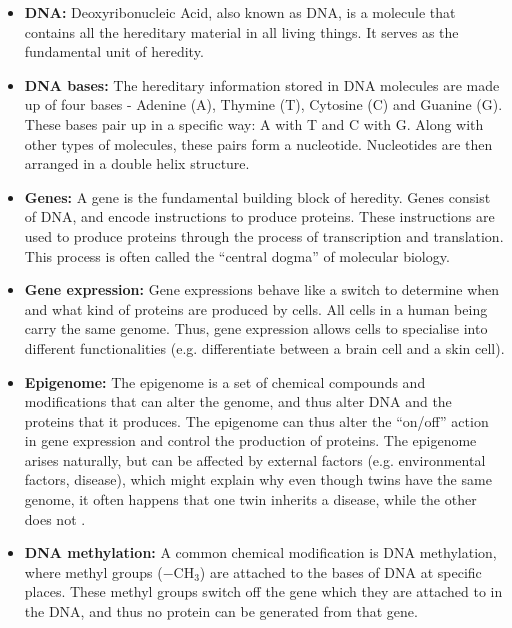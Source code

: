 \documentclass[12pt, twoside, a4paper]{article}
\begin{document}
\begin{itemize}
\item \textbf{DNA:} Deoxyribonucleic Acid, also known as DNA, is a molecule that contains all the hereditary material in all living things. It serves as the fundamental unit of heredity.

\item \textbf{DNA bases:} The hereditary information stored in DNA molecules are made up of four bases - Adenine (A), Thymine (T), Cytosine (C) and Guanine (G). These bases pair up in a specific way: A with T and C with G. Along with other types of molecules, these pairs form a nucleotide. Nucleotides are then arranged in a double helix structure.

\item \textbf{Genes:} A gene is the fundamental building block of heredity. Genes consist of DNA, and encode instructions to produce proteins. These instructions are used to produce proteins through the process of transcription and translation. This process is often called the ``central dogma'' of molecular biology.

\item \textbf{Gene expression:} Gene expressions behave like a switch to determine when and what kind of proteins are produced by cells. All cells in a human being carry the same genome. Thus, gene expression allows cells to specialise into different functionalities (e.g. differentiate between a brain cell and a skin cell).

\item \textbf{Epigenome:} The epigenome is a set of chemical compounds and modifications that can alter the genome, and thus alter DNA and the proteins that it produces. The epigenome can thus alter the ``on/off'' action in gene expression and control the production of proteins. The epigenome arises naturally, but can be affected by external factors (e.g. environmental factors, disease), which might explain why even though twins have the same genome, it often happens that one twin inherits a disease, while the other does not \cite{RefWorks:107}.

\item \textbf{DNA methylation:} A common chemical modification is DNA methylation, where methyl groups ($-$CH$_3$) are attached to the bases of DNA at specific places. These methyl groups switch off the gene which they are attached to in the DNA, and thus no protein can be generated from that gene.
\end{itemize}
\end{document}
